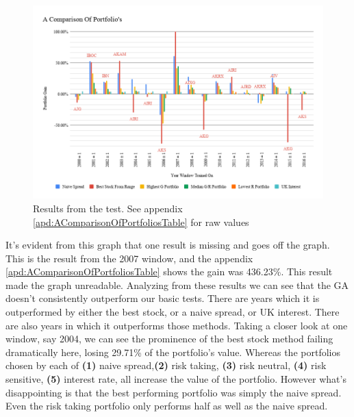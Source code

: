 \documentclass[11pt]{article}
\begin{document}
    \begin{figure}[H] %
        \includegraphics[width=\textwidth]{AComparisonOfPortfolios}
        \caption{Results from the test. See appendix \ref{apd:AComparisonOfPortfoliosTable} for raw values}
            \label{fig:AComparisonOfPortfolios}
    \end{figure}

    It's evident from this graph that one result is missing and goes off the graph. This
    is the result from the 2007 window, and the appendix \ref{apd:AComparisonOfPortfoliosTable}
    shows the gain was 436.23\%. This result made the graph unreadable. Analyzing
    from these results we can see that the GA doesn't consistently outperform our basic
    tests. There are years which it is outperformed by either the best stock, or a naive
    spread, or UK interest. There are also years in which it outperforms those methods.
    Taking a closer
    look at one window, say 2004, we can see the prominence of the best stock method
    failing dramatically here, losing 29.71\% of the portfolio's value. Whereas
    the portfolios chosen by each of \textbf{(1)} naive spread,\textbf{(2)} risk taking, \textbf{(3)} risk neutral, \textbf{(4)} risk
    sensitive, \textbf{(5)} interest rate, all increase the value of the portfolio. However
    what's disappointing is that the best performing portfolio was simply the naive spread.
    Even the risk taking portfolio only performs half as well as the naive spread.
\end{document}
